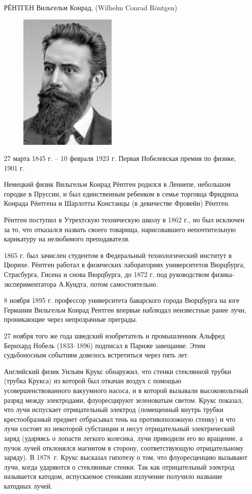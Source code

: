 \documentclass[a4paper,14pt, openany, twoside, draft]{extbook} %
\begin{document}
РЁНТГЕН Вильгельм Конрад, (Wilhelm Conrad Röntgen)

\begin{figure}
\centering
\includegraphics[width=4.794cm,height=6.798cm]{a11-img001.jpg}
\end{figure}
27 марта 1845 г. – 10 февраля 1923 г. Первая Нобелевская премия по физике, 1901 г.

Немецкий физик Вильгельм Конрад Рёнтген родился в Леннепе, небольшом городке в Пруссии, и был единственным ребенком в семье торговца Фридриха Конрада Рёнтгена и Шарлотты Констанцы (в девичестве Фровейн) Рёнтген.

Рёнтген поступил в Утрехтскую техническую школу в 1862 г., но был исключен за то, что отказался назвать своего товарища, нарисовавшего непочтительную карикатуру на нелюбимого преподавателя.

1865 г. был зачислен студентом в Федеральный технологический институт в Цюрихе. Рёнтген работал в физических лабораториях университетов Вюрцбурга, Страсбурга, Гисена и снова Вюрцбурга, до 1872 г. под руководством физика-экспериментатора А.Кундта, потом самостоятельно.

8 ноября 1895 г. профессор университета баварского города Вюрцбурга на юге Германии Вильгельм Конрад Рентген впервые наблюдал неизвестные ранее лучи, проникающие через непрозрачные преграды.

27 ноября того же года шведский изобретатель и промышленник Альфред Бернхард Нобель (1833–1896) подписал в Париже завещание. Этим судьбоносным событиям довелось встретиться через пять лет.

Английский физик Уильям Крукс обнаружил, что стенки стеклянной трубки (трубка Крукса) из которой был откачан воздух с помощью усовершенствованного вакуумного насоса, и в которой вызывали высоковольтный разряд между электродами, флуоресцируют зеленоватым светом. Крукс показал, что лучи испускает отрицательный электрод (помещенный внутрь трубки крестообразный предмет отбрасывал тень на противоположную стенку) и что лучи состоят из некоторой субстанции и несут отрицательный электрический заряд (ударяясь о лопасти легкого колесика, лучи приводили его во вращение, а пучок лучей отклонялся магнитом в сторону, соответствующую отрицательному заряду). В 1878~г. Крукс высказал гипотезу о том, что флуоресценцию вызывают лучи, когда ударяются о стеклянные стенки. Так как отрицательный электрод называется катодом, испускаемое стенками излучение получило название катодных лучей.
\end{document}
